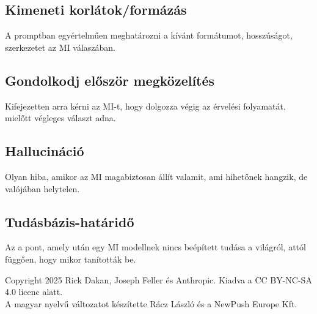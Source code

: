 \documentclass[a4paper, 11pt]{article}
\begin{document}
\begin{multicols}{2}
\subsection{Kimeneti korlátok/formázás}
A promptban egyértelműen meghatározni a kívánt formátumot, hosszúságot, szerkezetet az MI válaszában.

\subsection{Gondolkodj először megközelítés}
Kifejezetten arra kérni az MI-t, hogy dolgozza végig az érvelési folyamatát, mielőtt végleges választ adna.

\subsection{Hallucináció}
Olyan hiba, amikor az MI magabiztosan állít valamit, ami hihetőnek hangzik, de valójában helytelen.

\subsection{Tudásbázis-határidő}
Az a pont, amely után egy MI modellnek nincs beépített tudása a világról, attól függően, hogy mikor tanították be.

\end{multicols}

\vfill
\begin{center}
\small
Copyright 2025 Rick Dakan, Joseph Feller és Anthropic. Kiadva a CC BY-NC-SA 4.0 licenc alatt.\\A magyar nyelvű változatot készítette Rácz László és a NewPush Europe Kft.
\end{center}
\end{document}
